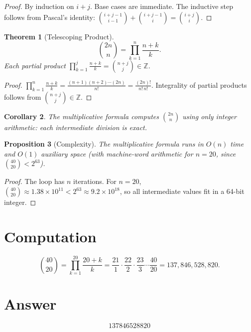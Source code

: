 \documentclass[12pt]{article}
\newtheorem{theorem}{Theorem}
\newtheorem{corollary}[theorem]{Corollary}
\newtheorem{proposition}[theorem]{Proposition}
\theoremstyle{definition}
\theoremstyle{remark}
\begin{document}
\begin{proof}
By induction on $i+j$. Base cases are immediate. The inductive step follows from Pascal's identity: $\binom{i+j-1}{i-1} + \binom{i+j-1}{i} = \binom{i+j}{i}$.
\end{proof}

\begin{theorem}[Telescoping Product]
\label{thm:prod}
\[
\binom{2n}{n} = \prod_{k=1}^{n} \frac{n+k}{k}.
\]
Each partial product $\prod_{k=1}^{j} \frac{n+k}{k} = \binom{n+j}{j} \in \mathbb{Z}$.
\end{theorem}

\begin{proof}
$\prod_{k=1}^{n} \frac{n+k}{k} = \frac{(n+1)(n+2)\cdots(2n)}{n!} = \frac{(2n)!}{n!\,n!}$. Integrality of partial products follows from $\binom{n+j}{j} \in \mathbb{Z}$.
\end{proof}

\begin{corollary}
The multiplicative formula computes $\binom{2n}{n}$ using only integer arithmetic: each intermediate division is exact.
\end{corollary}

\begin{proposition}[Complexity]
The multiplicative formula runs in $O(n)$ time and $O(1)$ auxiliary space (with machine-word arithmetic for $n = 20$, since $\binom{40}{20} < 2^{63}$).
\end{proposition}

\begin{proof}
The loop has $n$ iterations. For $n = 20$, $\binom{40}{20} \approx 1.38 \times 10^{11} < 2^{63} \approx 9.2 \times 10^{18}$, so all intermediate values fit in a 64-bit integer.
\end{proof}

\section{Computation}

\[
\binom{40}{20} = \prod_{k=1}^{20} \frac{20+k}{k} = \frac{21}{1} \cdot \frac{22}{2} \cdot \frac{23}{3} \cdots \frac{40}{20} = 137{,}846{,}528{,}820.
\]

\section{Answer}

\[
\boxed{137846528820}
\]
\end{document}
